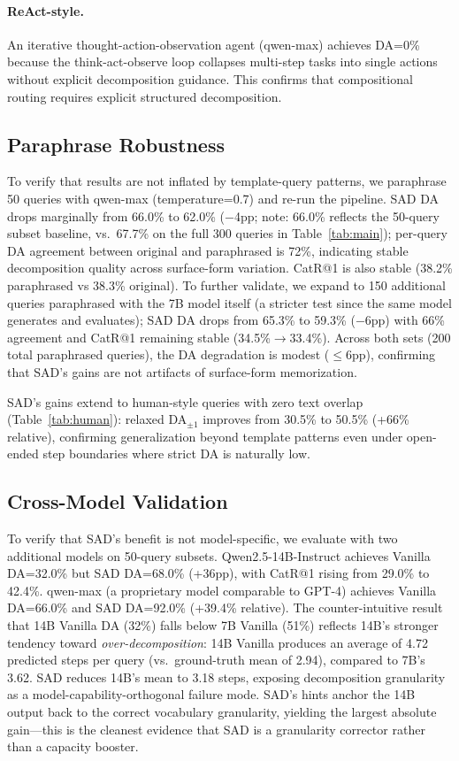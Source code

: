 \documentclass[11pt]{article}
\begin{document}
\paragraph{ReAct-style.}
An iterative thought-action-observation agent (qwen-max) achieves DA=0\% because the think-act-observe loop collapses multi-step tasks into single actions without explicit decomposition guidance.
This confirms that compositional routing requires explicit structured decomposition.

\subsection{Paraphrase Robustness}

To verify that results are not inflated by template-query patterns, we paraphrase 50 queries with qwen-max (temperature=0.7) and re-run the pipeline.
SAD DA drops marginally from 66.0\% to 62.0\% ($-$4pp; note: 66.0\% reflects the 50-query subset baseline, vs.\ 67.7\% on the full 300 queries in Table~\ref{tab:main}); per-query DA agreement between original and paraphrased is 72\%, indicating stable decomposition quality across surface-form variation.
CatR@1 is also stable (38.2\% paraphrased vs 38.3\% original).
To further validate, we expand to 150 additional queries paraphrased with the 7B model itself (a stricter test since the same model generates and evaluates); SAD DA drops from 65.3\% to 59.3\% ($-$6pp) with 66\% agreement and CatR@1 remaining stable (34.5\%$\to$33.4\%).
Across both sets (200 total paraphrased queries), the DA degradation is modest ($\leq$6pp), confirming that SAD's gains are not artifacts of surface-form memorization.

SAD's gains extend to human-style queries with zero text overlap (Table~\ref{tab:human}): relaxed DA$_{\pm 1}$ improves from 30.5\% to 50.5\% (+66\% relative), confirming generalization beyond template patterns even under open-ended step boundaries where strict DA is naturally low.

\subsection{Cross-Model Validation}
\label{sec:cross-model}

To verify that SAD's benefit is not model-specific, we evaluate with two additional models on 50-query subsets.
Qwen2.5-14B-Instruct achieves Vanilla DA=32.0\% but SAD DA=68.0\% (+36pp), with CatR@1 rising from 29.0\% to 42.4\%.
qwen-max (a proprietary model comparable to GPT-4) achieves Vanilla DA=66.0\% and SAD DA=92.0\% (+39.4\% relative).
The counter-intuitive result that 14B Vanilla DA (32\%) falls below 7B Vanilla (51\%) reflects 14B's stronger tendency toward \emph{over-decomposition}: 14B Vanilla produces an average of 4.72 predicted steps per query (vs.\ ground-truth mean of 2.94), compared to 7B's 3.62. SAD reduces 14B's mean to 3.18 steps, exposing decomposition granularity as a model-capability-orthogonal failure mode. SAD's hints anchor the 14B output back to the correct vocabulary granularity, yielding the largest absolute gain---this is the cleanest evidence that SAD is a granularity corrector rather than a capacity booster.
\end{document}
